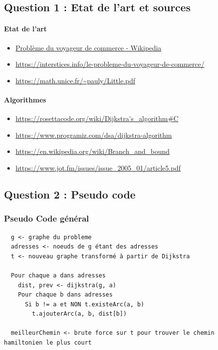  \subsection{Question 1 : Etat de l'art et sources}
    \paragraph{Etat de l'art}
    \begin{itemize}
     \item \href{https://fr.wikipedia.org/wiki/Probl%C3%A8me_du_voyageur_de_commerce#:~:text=En%20informatique,%20le%20probl%C3%A8me%20du,une%20et%20une%20seule%20fois.}{Problème du voyageur de commerce - Wikipedia}
     \item \url{https://interstices.info/le-probleme-du-voyageur-de-commerce/}
     \item \url{https://math.unice.fr/~pauly/Little.pdf}
    \end{itemize}

    \paragraph{Algorithmes}
    \begin{itemize}
     \item \url{https://rosettacode.org/wiki/Dijkstra's_algorithm#C}
     \item \url{https://www.programiz.com/dsa/dijkstra-algorithm}
     \item \url{https://en.wikipedia.org/wiki/Branch_and_bound}
     \item \url{https://www.jot.fm/issues/issue_2005_01/article5.pdf}
    \end{itemize}

  \subsection{Question 2 : Pseudo code}
      \subsubsection{Pseudo Code général}
        \begin{lstlisting}
  g <- graphe du probleme
  adresses <- noeuds de g étant des adresses
  t <- nouveau graphe transformé à partir de Dijkstra

  Pour chaque a dans adresses
    dist, prev <- dijkstra(g, a)
    Pour chaque b dans adresses
      Si b != a et NON t.existeArc(a, b)
        t.ajouterArc(a, b, dist[b])

  meilleurChemin <- brute force sur t pour trouver le chemin hamiltonien le plus court




        \end{lstlisting}

